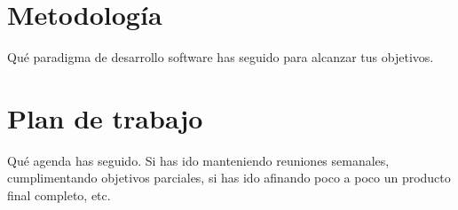 \section{Metodología}
\label{sec:metodologia}

Qué paradigma de desarrollo software has seguido para alcanzar tus objetivos.

\section{Plan de trabajo}
\label{sec:plantrabajo}

Qué agenda has seguido. Si has ido manteniendo reuniones semanales, cumplimentando objetivos parciales, si has ido afinando poco a poco un producto final completo, etc.
